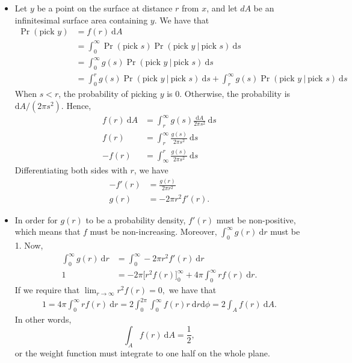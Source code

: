 \documentclass[10pt]{article}
\newcommand{\dee}{\mathrm{d}}
\begin{document}
\begin{itemize}
	\item Let $y$ be a point on the surface at distance $r$ from $x$, and let $dA$ be an
		infinitesimal surface area containing $y$. We have that
		\begin{align*}
			\Pr(\mbox{pick $y$})
			&= f(r)\ \dee A \\
			&= \int_{0}^\infty \Pr(\mbox{pick $s$}) \Pr(\mbox{pick $y$}\ |\ \mbox{pick $s$})\ \dee s \\
			&= \int_{0}^\infty g(s) \Pr(\mbox{pick $y$}\ |\ \mbox{pick $s$})\ \dee s\\
			&= \int_{0}^r g(s) \Pr(\mbox{pick $y$}\ |\ \mbox{pick $s$})\ \dee s
				+ \int_{r}^\infty g(s) \Pr(\mbox{pick $y$}\ |\ \mbox{pick $s$})\ \dee s
		\end{align*}
		When $s < r$, the probability of picking $y$ is $0$. Otherwise, the 
		probability is $\dee A / (2\pi s^2).$ Hence,
		\begin{align*}
			f(r)\ \dee A &= \int_{r}^\infty g(s) \frac{\dee A}{2\pi s^2}\ \dee s\\
			f(r) &= \int_{r}^\infty \frac{g(s)}{2\pi s^2}\ \dee s\\
			-f(r) &= \int_\infty^{r} \frac{g(s)}{2\pi s^2}\ \dee s
		\end{align*}
		Differentiating both sides with $r$, we have
		\begin{align*}
			-f'(r) &= \frac{g(r)}{2\pi r^2}\\
			g(r) &= -2\pi r^2 f'(r).
		\end{align*}
	
	\item In order for $g(r)$ to be a probability density, $f'(r)$ must be non-positive,
		which means that $f$ must be non-increasing. Moreover, $\int_0^\infty g(r)\ \dee r$
		must be 1. Now,
		\begin{align*}
			\int_0^\infty g(r)\ \dee r &= \int_0^\infty -2\pi r^2 f'(r)\ \dee r\\
			1 &= - 2\pi \bigg[ r^2 f(r) \bigg]_0^\infty + 4\pi \int_0^\infty r f(r)\ \dee r.
		\end{align*}
		If we require that $\lim_{r \rightarrow \infty} r^2 f(r) = 0,$ 
		we have that
		\begin{align*}
			1 = 4\pi \int_0^\infty r f(r)\ \dee r = 2 \int_0^{2 \pi} \int_0^\infty f(r) r\ \dee r \dee \phi = 2\int_A f(r)\ \dee A.
		\end{align*}
		In other words, $$\int_A f(r)\ \dee A = \frac{1}{2},$$
		or the weight function must integrate to one half on the whole plane.
		

\end{itemize}
\end{document}
